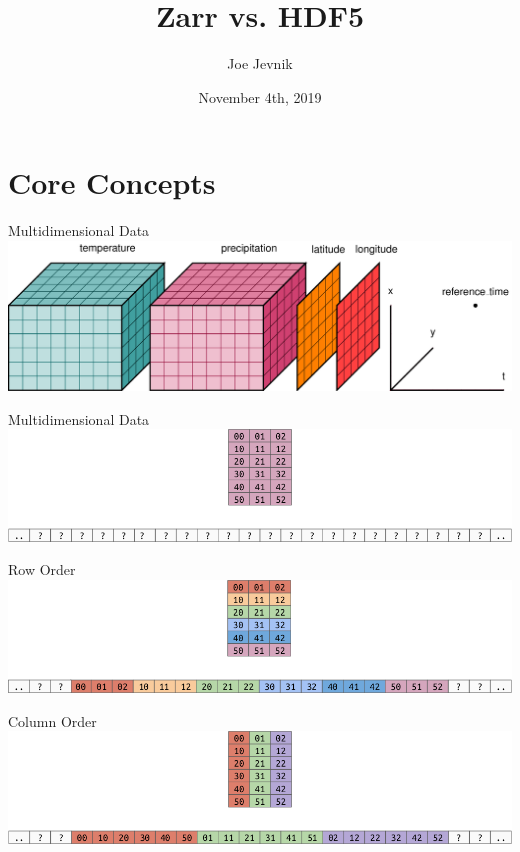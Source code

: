 \documentclass{beamer}
\title{Zarr vs. HDF5}
\date{November 4th, 2019}
\author{Joe Jevnik}
\institute{Boston Python}
\begin{document}
\maketitle

\newcommand{\zarr}{\texttt{zarr}}
\newcommand{\hfpy}{\texttt{h5py}}

\section{Core Concepts}

\begin{frame}{Multidimensional Data}
  \includegraphics[width=1.00\textwidth]{images/multidimensional-data.png}
\end{frame}

\begin{frame}{Multidimensional Data}
  \includegraphics[width=1.00\textwidth]{images/2d-array.png}
\end{frame}

\begin{frame}{Row Order}
  \includegraphics[width=1.00\textwidth]{images/row-order.png}
\end{frame}

\begin{frame}{Column Order}
  \includegraphics[width=1.00\textwidth]{images/column-order.png}
\end{frame}
\end{document}
